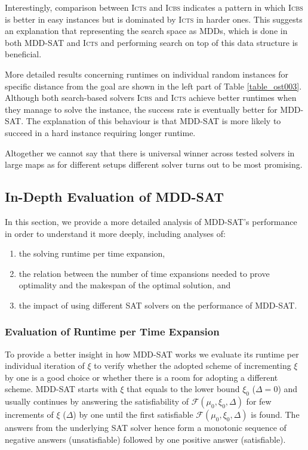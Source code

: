 \documentclass[jair,oneside,11pt]{article}
\begin{document}
Interestingly, comparison between \textsc{Icts} and \textsc{Icbs} indicates a pattern in which \textsc{Icbs} is better in easy instances but is dominated by \textsc{Icts} in harder ones. This suggests an explanation that representing the search space as MDDs, which is done in both MDD-SAT and \textsc{Icts} and performing search on top of this data structure is beneficial.

More detailed results concerning runtimes on individual random instances for specific distance from the goal are shown in the left part of Table \ref{table_ost003}. Although both search-based solvers \textsc{Icbs} and \textsc{Icts} achieve better runtimes when they manage to solve the instance, the success rate is eventually better for MDD-SAT. The explanation of this behaviour is that MDD-SAT is more likely to succeed in a hard instance requiring longer runtime.

Altogether we cannot say that there is universal winner across tested solvers in large maps as for different setups different solver turns out to be most promising.

\subsection{In-Depth Evaluation of MDD-SAT}

In this section, we provide a more detailed analysis of MDD-SAT's performance in order to understand it more deeply, including analyses of:

\begin{enumerate}
\item the solving runtime per time expansion,
\item the relation between the number of time expansions needed to prove optimality and the makespan of the optimal solution, and 
\item the impact of using different SAT solvers on the performance of MDD-SAT. 
\end{enumerate}


\subsubsection{Evaluation of Runtime per Time Expansion}

To provide a better insight in how MDD-SAT works we evaluate its runtime per individual iteration of $\xi$ to verify whether the adopted scheme of incrementing $\xi$ by one is a good choice or whether there is a room for adopting a different scheme. MDD-SAT starts with $\xi$ that equals to the lower bound $\xi_0$ ($\Delta = 0$) and usually continues by answering the satisfiability of $\mathcal{F}(\mu_0, \xi_0, \Delta)$ for few increments of $\xi$ ($\Delta$) by one until the first satisfiable $\mathcal{F}(\mu_0, \xi_0, \Delta)$ is found. The answers from the underlying SAT solver hence form a monotonic sequence of negative answers (unsatisfiable) followed by one positive answer (satisfiable).
\end{document}
